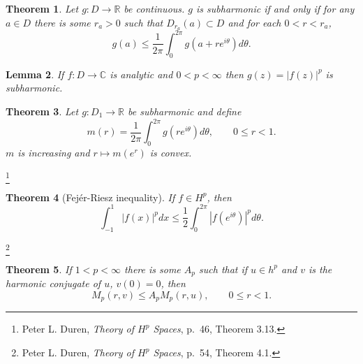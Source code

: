 \documentclass{article}
\newtheorem{theorem}{Theorem}
\newtheorem{lemma}[theorem]{Lemma}
\theoremstyle{definition}
\begin{document}
\begin{theorem}
Let $g:D \to \mathbb{R}$ be continuous. $g$ is subharmonic if and only if
for any $a \in D$ there is some $r_a>0$ such that $D_{r_a}(a) \subset D$ and for each
$0<r<r_a$,
\[
g(a) \leq \frac{1}{2\pi} \int_0^{2\pi} g(a+ r e^{i\theta}) d\theta.
\]
\end{theorem}


\begin{lemma}
If $f:D \to \mathbb{C}$ is analytic and $0<p<\infty$ then $g(z)=|f(z)|^p$ is subharmonic.
\end{lemma}


\begin{theorem}
Let $g:D_1 \to \mathbb{R}$ be subharmonic and define
\[
m(r) = \frac{1}{2\pi} \int_0^{2\pi} g(re^{i\theta}) d\theta,\qquad 0 \leq r < 1.
\]
$m$ is increasing and $r \mapsto m(e^r)$ is convex.
\end{theorem}


\footnote{Peter L. Duren,
{\em Theory of $H^p$ Spaces}, p.~46, Theorem 3.13.}

\begin{theorem}[Fej\'er-Riesz inequality]
If $f \in H^p$, then
\[
\int_{-1}^1 |f(x)|^p dx \leq \frac{1}{2} \int_0^{2\pi} |f(e^{i\theta})|^p d\theta.
\]
\end{theorem}


\footnote{Peter L. Duren,
{\em Theory of $H^p$ Spaces}, p.~54, Theorem 4.1.}

\begin{theorem}
If $1<p<\infty$ there is some $A_p$ such that
if $u \in h^p$ and $v$ is the harmonic conjugate of $u$, $v(0)=0$, then 
\[
M_p(r,v) \leq A_p M_p(r,u),\qquad 0 \leq r <1.
\]
\end{theorem}
\end{document}
